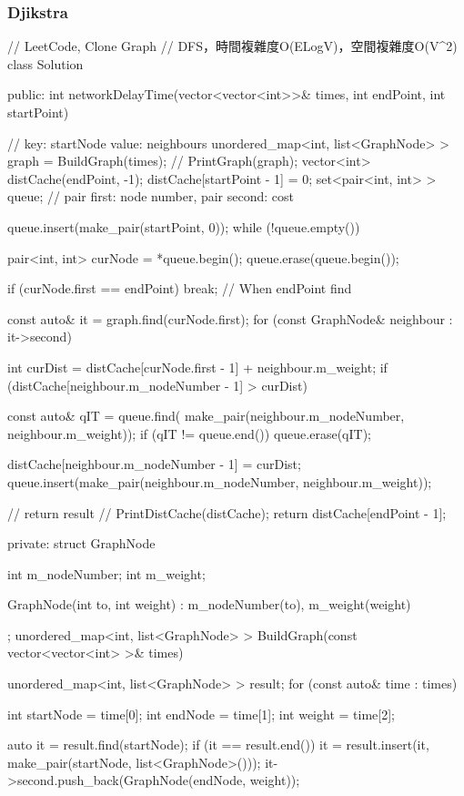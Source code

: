 \subsubsection{Djikstra}
\begin{Code}
// LeetCode, Clone Graph
// DFS，時間複雜度O(ELogV)，空間複雜度O(V^2)
class Solution {
public:
    int networkDelayTime(vector<vector<int>>& times, int endPoint, int startPoint)
    {
        // key: startNode value: neighbours
        unordered_map<int, list<GraphNode> > graph = BuildGraph(times);
        // PrintGraph(graph);
        vector<int> distCache(endPoint, -1); distCache[startPoint - 1] = 0;
        set<pair<int, int> > queue; // pair first: node number, pair second: cost

        queue.insert(make_pair(startPoint, 0));
        while (!queue.empty())
        {
            pair<int, int> curNode = *queue.begin();
            queue.erase(queue.begin());

            if (curNode.first == endPoint) break; // When endPoint find

            const auto& it = graph.find(curNode.first);
            for (const GraphNode& neighbour : it->second)
            {
                int curDist = distCache[curNode.first - 1] + neighbour.m_weight;
                if (distCache[neighbour.m_nodeNumber - 1] > curDist)
                {
                    const auto& qIT = queue.find(
                                    make_pair(neighbour.m_nodeNumber, neighbour.m_weight));
                    if (qIT != queue.end())
                        queue.erase(qIT);

                    distCache[neighbour.m_nodeNumber - 1] = curDist;
                    queue.insert(make_pair(neighbour.m_nodeNumber, neighbour.m_weight));
                }
            }
        }
        // return result
        // PrintDistCache(distCache);
        return distCache[endPoint - 1];
    }
private:
    struct GraphNode
    {
        int m_nodeNumber;
        int m_weight;

        GraphNode(int to, int weight)
            : m_nodeNumber(to), m_weight(weight)
        {
        }
    };
    unordered_map<int, list<GraphNode> > BuildGraph(const vector<vector<int> >& times)
    {
        unordered_map<int, list<GraphNode> > result;
        for (const auto& time : times)
        {
            int startNode = time[0];
            int endNode = time[1];
            int weight = time[2];

            auto it = result.find(startNode);
            if (it == result.end())
            {
                it = result.insert(it, make_pair(startNode, list<GraphNode>()));
            }
            it->second.push_back(GraphNode(endNode, weight));
        }

}}
\end{Code}
